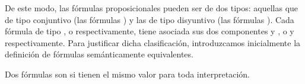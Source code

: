 \begin{isabellebody}
\begin{isamarkuptext}

  De este modo, las fórmulas proposicionales pueden ser de dos tipos: aquellas que 
  de tipo conjuntivo (las fórmulas \isa{{\isasymalpha}}) y las de tipo disyuntivo (las fórmulas \isa{{\isasymbeta}}). 
  Cada fórmula de tipo \isa{{\isasymalpha}}, o \isa{{\isasymbeta}} respectivamente, tiene asociada sus  
  dos componentes  y , o  y  respectivamente. Para justificar dicha clasificación,
  introduzcamos inicialmente la definición de fórmulas semánticamente equivalentes.

  \begin{definicion}
    Dos fórmulas son  si tienen el mismo valor para toda 
    interpretación.
  \end{definicion}


\end{isamarkuptext}
\end{isabellebody}
